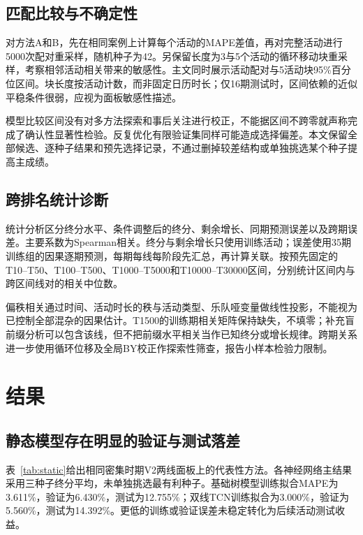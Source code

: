 \documentclass[a4paper,11pt,fontset=none]{ctexart}
\begin{document}
\subsection{匹配比较与不确定性}

对方法A和B，先在相同案例上计算每个活动的MAPE差值，再对完整活动进行5000次配对重采样，随机种子为42。另保留长度为3与5个活动的循环移动块重采样，考察相邻活动相关带来的敏感性\citep{kunsch1989bootstrap}。主文同时展示活动配对与5活动块95\%百分位区间。块长度按活动计数，而非固定日历时长；仅16期测试时，区间依赖的近似平稳条件很弱，应视为面板敏感性描述。

模型比较区间没有对多方法探索和事后关注进行校正，不能据区间不跨零就声称完成了确认性显著性检验。反复优化有限验证集同样可能造成选择偏差\citep{cawley2010selection}。本文保留全部候选、逐种子结果和预先选择记录，不通过删掉较差结构或单独挑选某个种子提高主成绩。

\subsection{跨排名统计诊断}

统计分析区分终分水平、条件调整后的终分、剩余增长、同期预测误差以及跨期误差。主要系数为Spearman相关。终分与剩余增长只使用训练活动；误差使用35期训练组的因果逐期预测，每期每线每阶段先汇总，再计算关联。按预先固定的T10--T50、T100--T500、T1000--T5000和T10000--T30000区间，分别统计区间内与跨区间线对的相关中位数。

偏秩相关通过时间、活动时长的秩与活动类型、乐队哑变量做线性投影，不能视为已控制全部混杂的因果估计。T1500的训练期相关矩阵保持缺失，不填零；补充盲前缀分析可以包含该线，但不把前缀水平相关当作已知终分或增长规律。跨期关系进一步使用循环位移及全局BY校正\citep{benjamini2001by}作探索性筛查，报告小样本检验力限制。

\section{结果}

\subsection{静态模型存在明显的验证与测试落差}

表~\ref{tab:static}给出相同密集时期V2两线面板上的代表性方法。各神经网络主结果采用三种子终分平均，未单独挑选最有利种子。基础树模型训练拟合MAPE为3.611\%，验证为6.430\%，测试为12.755\%；双线TCN训练拟合为3.000\%，验证为5.560\%，测试为14.392\%。更低的训练或验证误差未稳定转化为后续活动测试收益。
\end{document}
